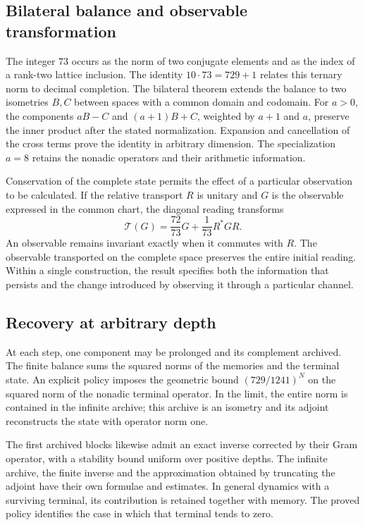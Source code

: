 \subsection*{Bilateral balance and observable transformation}
The integer \(73\) occurs as the norm of two conjugate elements and as the index of a rank-two lattice inclusion. The identity \(10\cdot73=729+1\) relates this ternary norm to decimal completion. The bilateral theorem extends the balance to two isometries \(B,C\) between spaces with a common domain and codomain. For \(a>0\), the components \(aB-C\) and \((a+1)B+C\), weighted by \(a+1\) and \(a\), preserve the inner product after the stated normalization. Expansion and cancellation of the cross terms prove the identity in arbitrary dimension. The specialization \(a=8\) retains the nonadic operators and their arithmetic information.

Conservation of the complete state permits the effect of a particular observation to be calculated. If the relative transport \(R\) is unitary and \(G\) is the observable expressed in the common chart, the diagonal reading transforms
\[
\mathcal T(G)=\frac{72}{73}G+\frac1{73}R^*GR.
\]
An observable remains invariant exactly when it commutes with \(R\). The observable transported on the complete space preserves the entire initial reading. Within a single construction, the result specifies both the information that persists and the change introduced by observing it through a particular channel.

\subsection*{Recovery at arbitrary depth}
At each step, one component may be prolonged and its complement archived. The finite balance sums the squared norms of the memories and the terminal state. An explicit policy imposes the geometric bound \((729/1241)^N\) on the squared norm of the nonadic terminal operator. In the limit, the entire norm is contained in the infinite archive; this archive is an isometry and its adjoint reconstructs the state with operator norm one.

The first archived blocks likewise admit an exact inverse corrected by their Gram operator, with a stability bound uniform over positive depths. The infinite archive, the finite inverse and the approximation obtained by truncating the adjoint have their own formulae and estimates. In general dynamics with a surviving terminal, its contribution is retained together with memory. The proved policy identifies the case in which that terminal tends to zero.

